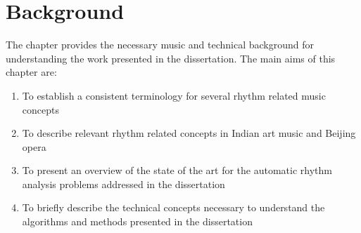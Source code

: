 \chapter{Background}\label{chap:bkgnd}
%
\begin{epigraphs}
\end{epigraphs}
%
\noindent The chapter provides the necessary music and technical background for understanding the work presented in the dissertation. The main aims of this chapter are:
\begin{enumerate}[leftmargin=*,itemsep=0pt]
  \item To establish a consistent terminology for several rhythm related music concepts
  \item To describe relevant rhythm related concepts in Indian art music and Beijing opera 
  \item To present an overview of the state of the art for the automatic rhythm analysis problems addressed in the dissertation
	\item To briefly describe the technical concepts necessary to understand the algorithms and methods presented in the dissertation
\end{enumerate}
